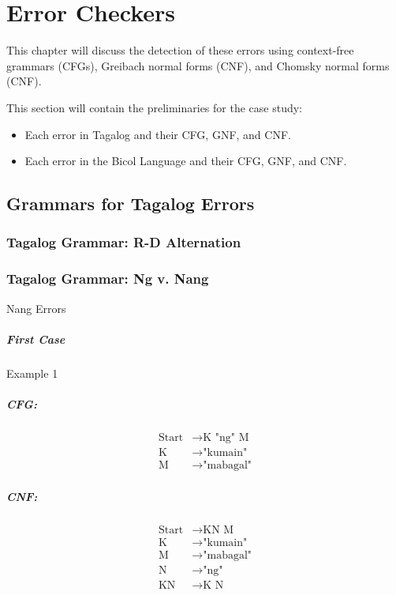 \chapter{Error Checkers}
This chapter will discuss the detection of these errors using context-free grammars (CFGs), Greibach normal forms (CNF), and Chomsky normal forms (CNF).

{\color{blue}
This section will contain the preliminaries for the case study:

\begin{itemize}
    \item Each error in Tagalog and their CFG, GNF, and CNF.
    \item Each error in the Bicol Language and their CFG, GNF, and CNF.
\end{itemize}
}

\section{Grammars for Tagalog Errors}
\subsection{Tagalog Grammar: R-D Alternation}
\subsection{Tagalog Grammar: Ng v. Nang}

Nang Errors

\paragraph{First Case}
Example 1
\paragraph{CFG:}
\begin{equation*}
    \begin{aligned}
        \text{Start}   & \rightarrow \text{K "ng" M}   \\
        \text{K} & \rightarrow \text{"kumain"}   \\
        \text{M} & \rightarrow \text{"mabagal"}
    \end{aligned}
\end{equation*}

\paragraph{CNF:}
\begin{equation*}
    \begin{aligned}
        \text{Start}   & \rightarrow \text{KN M}   \\
        \text{K} & \rightarrow \text{"kumain"}   \\
        \text{M} & \rightarrow \text{"mabagal"} \\
        \text{N} & \rightarrow \text{"ng"} \\
        \text{KN} & \rightarrow \text{K N}
    \end{aligned}
\end{equation*}

